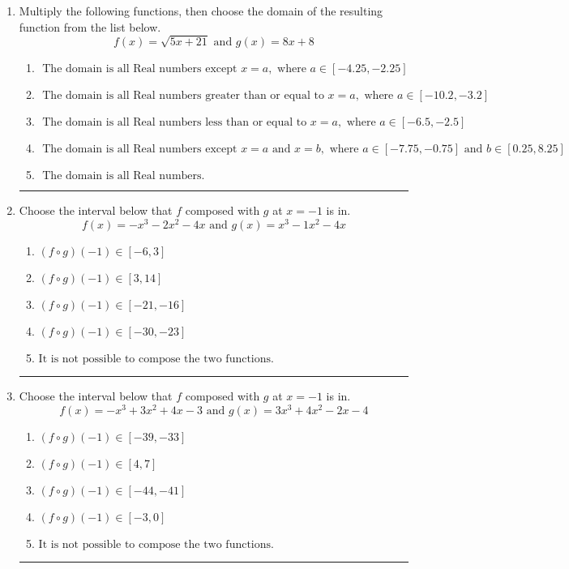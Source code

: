 \documentclass[14pt]{extbook}
\newcommand{\litem}[1]{\item#1\hspace*{-1cm}\rule{\textwidth}{0.4pt}}
\begin{document}
\begin{enumerate}
{\begin{enumerate}[label=\Alph*.]
\end{enumerate} }
\litem{
Multiply the following functions, then choose the domain of the resulting function from the list below.\[ f(x) = \sqrt{5x+21}  \text{ and } g(x) = 8x + 8 \]\begin{enumerate}[label=\Alph*.]
\item \( \text{ The domain is all Real numbers except } x = a, \text{ where } a \in [-4.25, -2.25] \)
\item \( \text{ The domain is all Real numbers greater than or equal to } x = a, \text{ where } a \in [-10.2, -3.2] \)
\item \( \text{ The domain is all Real numbers less than or equal to } x = a, \text{ where } a \in [-6.5, -2.5] \)
\item \( \text{ The domain is all Real numbers except } x = a \text{ and } x = b, \text{ where } a \in [-7.75, -0.75] \text{ and } b \in [0.25, 8.25] \)
\item \( \text{ The domain is all Real numbers. } \)

\end{enumerate} }
\litem{
Choose the interval below that $f$ composed with $g$ at $x=-1$ is in.\[ f(x) = -x^{3} -2 x^{2} -4 x \text{ and } g(x) = x^{3} -1 x^{2} -4 x \]\begin{enumerate}[label=\Alph*.]
\item \( (f \circ g)(-1) \in [-6, 3] \)
\item \( (f \circ g)(-1) \in [3, 14] \)
\item \( (f \circ g)(-1) \in [-21, -16] \)
\item \( (f \circ g)(-1) \in [-30, -23] \)
\item \( \text{It is not possible to compose the two functions.} \)

\end{enumerate} }
\litem{
Choose the interval below that $f$ composed with $g$ at $x=-1$ is in.\[ f(x) = -x^{3} +3 x^{2} +4 x -3 \text{ and } g(x) = 3x^{3} +4 x^{2} -2 x -4 \]\begin{enumerate}[label=\Alph*.]
\item \( (f \circ g)(-1) \in [-39, -33] \)
\item \( (f \circ g)(-1) \in [4, 7] \)
\item \( (f \circ g)(-1) \in [-44, -41] \)
\item \( (f \circ g)(-1) \in [-3, 0] \)
\item \( \text{It is not possible to compose the two functions.} \)

\end{enumerate} }
\end{enumerate}
\end{document}
